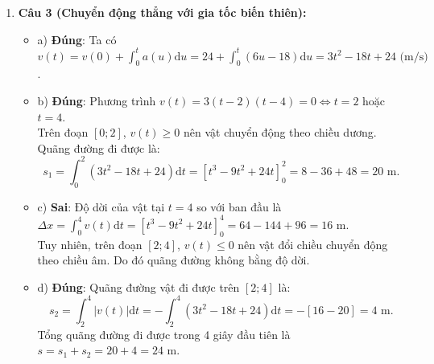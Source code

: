 \documentclass[12pt,a4paper]{article}
\begin{document}
\begin{enumerate}[label=\textbf{Câu \arabic*:}, leftmargin=*]
\item \textbf{Câu 3 (Chuyển động thẳng với gia tốc biến thiên):}
\begin{itemize}
    \item a) \textbf{Đúng}: Ta có $v(t) = v(0) + \int_0^t a(u) \mathrm{d}u = 24 + \int_0^t (6u - 18) \mathrm{d}u = 3t^2 - 18t + 24\text{ (m/s)}$.
    \item b) \textbf{Đúng}: Phương trình $v(t) = 3(t - 2)(t - 4) = 0 \iff t = 2$ hoặc $t = 4$.\\
    Trên đoạn $[0; 2]$, $v(t) \ge 0$ nên vật chuyển động theo chiều dương. Quãng đường đi được là:
    $$s_1 = \int_0^2 (3t^2 - 18t + 24) \mathrm{d}t = \left[ t^3 - 9t^2 + 24t \right]_0^2 = 8 - 36 + 48 = 20\text{ m}.$$
    \item c) \textbf{Sai}: Độ dời của vật tại $t = 4$ so với ban đầu là $\Delta x = \int_0^4 v(t) \mathrm{d}t = \left[ t^3 - 9t^2 + 24t \right]_0^4 = 64 - 144 + 96 = 16\text{ m}$.\\
    Tuy nhiên, trên đoạn $[2; 4]$, $v(t) \le 0$ nên vật đổi chiều chuyển động theo chiều âm. Do đó quãng đường không bằng độ dời.
    \item d) \textbf{Đúng}: Quãng đường vật đi được trên $[2; 4]$ là:
    $$s_2 = \int_2^4 |v(t)| \mathrm{d}t = -\int_2^4 (3t^2 - 18t + 24) \mathrm{d}t = -\left[ 16 - 20 \right] = 4\text{ m}.$$
    Tổng quãng đường đi được trong 4 giây đầu tiên là $s = s_1 + s_2 = 20 + 4 = 24\text{ m}$.
\end{itemize}


\end{enumerate}
\end{document}
